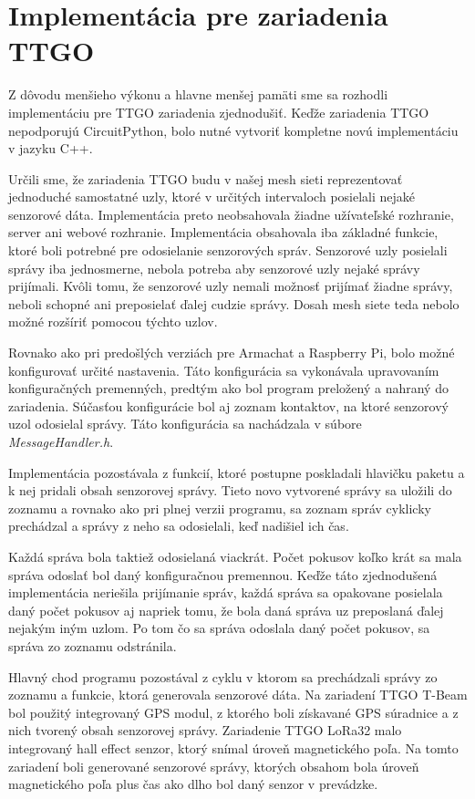 \documentclass[slovak,master]{diploma}
\begin{document}
\section{Implementácia pre zariadenia TTGO}
Z dôvodu menšieho výkonu a hlavne menšej pamäti sme sa rozhodli implementáciu pre TTGO zariadenia zjednodušiť. Keďže zariadenia TTGO nepodporujú 
CircuitPython, bolo nutné vytvoriť kompletne novú implementáciu v jazyku C++.

Určili sme, že zariadenia TTGO budu v našej mesh sieti reprezentovať jednoduché samostatné uzly, ktoré v určitých intervaloch posielali nejaké senzorové dáta. Implementácia preto 
neobsahovala žiadne užívateľské rozhranie, server ani webové rozhranie. Implementácia obsahovala iba základné funkcie, ktoré boli potrebné pre 
odosielanie senzorových správ. Senzorové uzly posielali správy iba jednosmerne, nebola potreba aby senzorové uzly nejaké správy prijímali. 
Kvôli tomu, že senzorové uzly nemali možnosť prijímať žiadne správy, neboli schopné ani preposielať ďalej cudzie správy. Dosah mesh siete teda nebolo možné 
rozšíriť pomocou týchto uzlov.

Rovnako ako pri predošlých verziách pre Armachat a Raspberry Pi, bolo možné konfigurovať určité nastavenia. Táto konfigurácia sa vykonávala upravovaním konfiguračných 
premenných, predtým ako bol program preložený a nahraný do zariadenia. Súčasťou konfigurácie bol aj zoznam kontaktov, na ktoré senzorový uzol odosielal správy. 
Táto konfigurácia sa nachádzala v súbore \emph{MessageHandler.h}.

Implementácia pozostávala z funkcií, ktoré postupne poskladali hlavičku paketu a k nej pridali obsah senzorovej správy. Tieto novo vytvorené správy sa uložili do zoznamu 
a rovnako ako pri plnej verzii programu, sa zoznam správ cyklicky prechádzal a správy z neho sa odosielali, keď nadišiel ich čas.

Každá správa bola taktiež odosielaná viackrát. Počet pokusov koľko krát sa mala správa odoslať bol daný konfiguračnou premennou. Keďže táto zjednodušená implementácia neriešila prijímanie správ, 
každá správa sa opakovane posielala daný počet pokusov aj napriek tomu, že bola daná správa uz preposlaná ďalej nejakým iným uzlom. Po tom čo sa správa odoslala 
daný počet pokusov, sa správa zo zoznamu odstránila.

Hlavný chod programu pozostával z cyklu v ktorom sa prechádzali správy zo zoznamu a funkcie, ktorá generovala senzorové dáta. Na zariadení TTGO T-Beam bol použitý integrovaný 
GPS modul, z ktorého boli získavané GPS súradnice a z nich tvorený obsah senzorovej správy. Zariadenie TTGO LoRa32 malo integrovaný hall effect senzor, ktorý snímal 
úroveň magnetického poľa. Na tomto zariadení boli generované senzorové správy, ktorých obsahom bola úroveň magnetického poľa plus čas ako dlho bol daný senzor v prevádzke.
\end{document}
